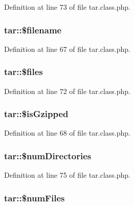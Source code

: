 Definition at line 73 of file tar.\-class.\-php.

\hypertarget{classtar_af99384023359a00770ca0ffb858b21fb}{
\subsubsection[{\$filename}]{\setlength{\rightskip}{0pt plus 5cm}tar\-::\$filename}}\label{classtar_af99384023359a00770ca0ffb858b21fb}


Definition at line 67 of file tar.\-class.\-php.

\hypertarget{classtar_a2082ab6894219b27e42024e925c4e11f}{
\subsubsection[{\$files}]{\setlength{\rightskip}{0pt plus 5cm}tar\-::\$files}}\label{classtar_a2082ab6894219b27e42024e925c4e11f}


Definition at line 72 of file tar.\-class.\-php.

\hypertarget{classtar_a82771381c948bca4c166212276fe4b46}{
\subsubsection[{\$is\-Gzipped}]{\setlength{\rightskip}{0pt plus 5cm}tar\-::\$is\-Gzipped}}\label{classtar_a82771381c948bca4c166212276fe4b46}


Definition at line 68 of file tar.\-class.\-php.

\hypertarget{classtar_a2406f376692c41ad3e3a62cf473738ec}{
\subsubsection[{\$num\-Directories}]{\setlength{\rightskip}{0pt plus 5cm}tar\-::\$num\-Directories}}\label{classtar_a2406f376692c41ad3e3a62cf473738ec}


Definition at line 75 of file tar.\-class.\-php.

\hypertarget{classtar_a03d688d94a5fa92720ff9b1c03e7c157}{
\subsubsection[{\$num\-Files}]{\setlength{\rightskip}{0pt plus 5cm}tar\-::\$num\-Files}}\label{classtar_a03d688d94a5fa92720ff9b1c03e7c157}


